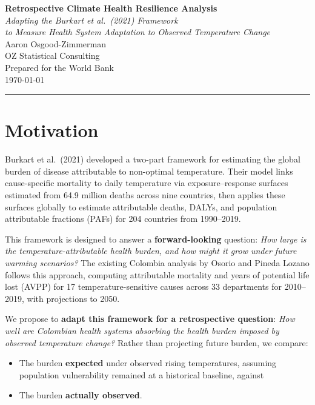 \documentclass[11pt,a4paper]{article}
\begin{document}
\begin{center}
  {\LARGE\bfseries Retrospective Climate Health Resilience Analysis}\\[0.5em]
  {\large\itshape Adapting the Burkart et al.\ (2021) Framework\\to Measure Health System Adaptation to Observed Temperature Change}\\[1.5em]
  {\normalsize Aaron Osgood-Zimmerman\\OZ Statistical Consulting\\[0.3em]
  Prepared for the World Bank\\[0.3em]
  \today}
\end{center}

\vspace{1em}
\hrule
\vspace{1.5em}

\section{Motivation}

Burkart et al.\ (2021) developed a two-part framework for estimating the global burden of disease attributable to non-optimal temperature. Their model links cause-specific mortality to daily temperature via exposure--response surfaces estimated from 64.9 million deaths across nine countries, then applies these surfaces globally to estimate attributable deaths, DALYs, and population attributable fractions (PAFs) for 204 countries from 1990--2019.

This framework is designed to answer a \textbf{forward-looking} question: \emph{How large is the temperature-attributable health burden, and how might it grow under future warming scenarios?} The existing Colombia analysis by Osorio and Pineda Lozano follows this approach, computing attributable mortality and years of potential life lost (AVPP) for 17 temperature-sensitive causes across 33 departments for 2010--2019, with projections to 2050.

We propose to \textbf{adapt this framework for a retrospective question}: \emph{How well are Colombian health systems absorbing the health burden imposed by observed temperature change?} Rather than projecting future burden, we compare:
\begin{itemize}[nosep]
  \item The burden \textbf{expected} under observed rising temperatures, assuming population vulnerability remained at a historical baseline, against
  \item The burden \textbf{actually observed}.
\end{itemize}
\end{document}
